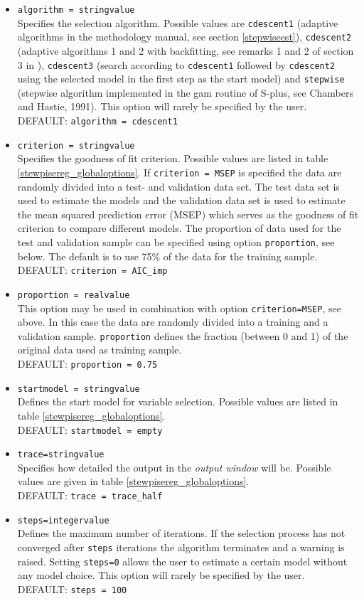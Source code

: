 \begin{itemize}
\item {\tt algorithm = stringvalue} \\
Specifies the selection algorithm. Possible values are {\tt cdescent1} (adaptive algorithms
in the methodology manual, see section \autoref{stepwiseest}),
{\tt cdescent2} (adaptive algorithms  1 and 2 with backfitting, see remarks 1 and 2 of section 3 in ), {\tt cdescent3} (search according to
{\tt cdescent1}  followed by {\tt cdescent2}  using the selected model in the first step as the start model) and {\tt stepwise}
(stepwise algorithm implemented in the gam routine of S-plus, see Chambers and Hastie, 1991).
This option will rarely be specified by the user. \\
DEFAULT: {\tt algorithm = cdescent1}
\item {\tt criterion = stringvalue} \\
Specifies the goodness of  fit criterion. Possible values are listed in table \autoref{stewpisereg_globaloptions}. If {\tt criterion = MSEP} is specified
the data are randomly divided into a test- and validation data set. The test data set is used to estimate the models and the validation data set is used to
estimate the mean squared prediction error (MSEP) which serves as the goodness of fit criterion to compare different models. The proportion of data used for
the test and validation sample can be specified using option {\tt proportion}, see below. The default is to use 75\% of the data for the training sample. \\
DEFAULT: {\tt criterion = AIC\_imp}
\item {\tt proportion = realvalue} \\
This option may be used in combination with option {\tt criterion=MSEP}, see above. In this case the data are randomly divided into
a training and a validation sample. {\tt proportion} defines the fraction (between 0 and 1)  of the original data used as training sample. \\
DEFAULT: {\tt proportion = 0.75}
\item {\tt startmodel = stringvalue} \\
Defines the start model for variable selection. Possible values are listed in table \autoref{stewpisereg_globaloptions}. \\
DEFAULT: {\tt startmodel = empty}
\item {\tt trace=stringvalue} \\
Specifies how detailed the output in the {\it output window} will be. Possible values are given in table \autoref{stewpisereg_globaloptions}. \\
DEFAULT: {\tt trace = trace\_half}
\item {\tt steps=integervalue}   \\
Defines the maximum number of iterations.  If the selection process  has not converged after {\tt steps} iterations the algorithm terminates and a warning is
raised. Setting {\tt steps=0} allows the user to estimate a certain model without any model choice. This option will rarely be specified by the user.\\
DEFAULT: {\tt steps = 100}
\end{itemize}



